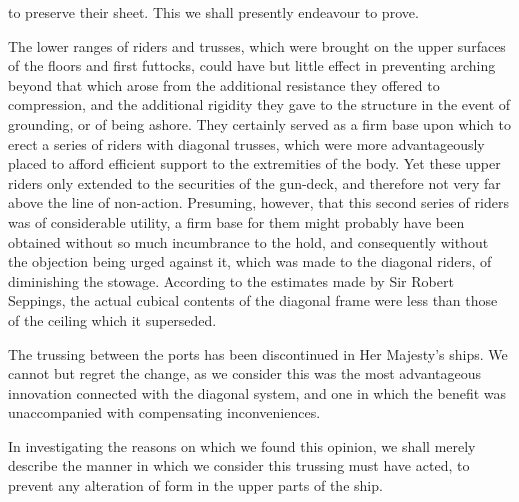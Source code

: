 \documentclass{article}
\begin{document}
to preserve their sheet. This we shall presently endeavour to prove.

The lower ranges of riders and trusses, which were brought on the upper surfaces of the floors and first futtocks, could have but little effect in preventing arching beyond that which arose from the additional resistance they offered to compression, and the additional rigidity they gave to the structure in the event of grounding, or of being ashore. They certainly served as a firm base upon which to erect a series of riders with diagonal trusses, which were more advantageously placed to afford efficient support to the extremities of the body. Yet these upper riders only extended to the securities of the gun-deck, and therefore not very far above the line of non-action. Presuming, however, that this second series of riders was of considerable utility, a firm base for them might probably have been obtained without so much incumbrance to the hold, and consequently without the objection being urged against it, which was made to the diagonal riders, of diminishing the stowage. According to the estimates made by Sir Robert Seppings, the actual cubical contents of the diagonal frame were less than those of the ceiling which it superseded.

The trussing between the ports has been discontinued in Her Majesty's ships. We cannot but regret the change, as we consider this was the most advantageous innovation connected with the diagonal system, and one in which the benefit was unaccompanied with compensating inconveniences.

In investigating the reasons on which we found this opinion, we shall merely describe the manner in which we consider this trussing must have acted, to prevent any alteration of form in the upper parts of the ship.
\end{document}
